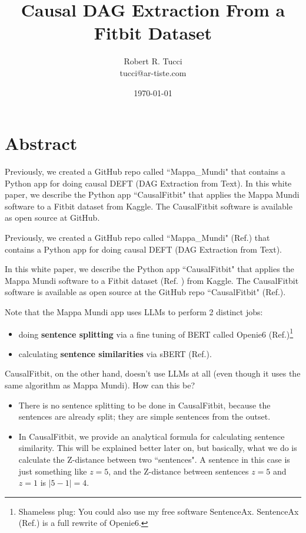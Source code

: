\documentclass[12pt]{article}
\begin{document}
\title{Causal DAG Extraction From a Fitbit Dataset}
\date{ \today}
\author{Robert R. Tucci\\
        tucci@ar-tiste.com}
\maketitle
\vskip2cm
\section*{Abstract}
Previously,
we created a GitHub repo called  ``Mappa\_Mundi"  that contains a Python app for
doing causal DEFT (DAG Extraction from Text).
In this white paper, we
describe the Python app ``CausalFitbit"
that applies the  Mappa Mundi software  to 
a Fitbit dataset from Kaggle.
The CausalFitbit software 
is available as open source at  GitHub.

\newpage

Previously,
we created a GitHub repo called  ``Mappa\_Mundi" (Ref.\cite{github-mappa-mundi}) that contains a Python app for
doing causal DEFT (DAG Extraction from Text).

In this white paper, we
describe the Python app ``CausalFitbit"
that applies the  Mappa Mundi software  to 
a Fitbit dataset (Ref. \cite{fitbit-dataset}) from Kaggle.
The CausalFitbit software 
is available as open source at the GitHub repo
``CausalFitbit" (Ref.\cite{causal-fitbit}).

Note that the Mappa Mundi app uses LLMs 
to perform 2 distinct jobs: 
\begin{itemize}
\item doing {\bf sentence splitting} via a fine tuning of BERT called Openie6 (Ref.\cite{openie6})\footnote{Shameless
plug: You could also use my free software SentenceAx. SentenceAx (Ref.\cite{sentence-ax}) is a full rewrite of Openie6.}

\item calculating {\bf sentence similarities} via sBERT (Ref.\cite{sbert}).
\end{itemize}

CausalFitbit, on the other hand,
doesn't use LLMs at all (even though it uses the same algorithm as Mappa Mundi). How can this be? 

\begin{itemize}
\item
There is no sentence splitting to be done in CausalFitbit, because the sentences are already split; they are simple sentences from the outset.  
\item In CausalFitbit, we provide an analytical
formula for calculating sentence similarity. This will be explained better later on,
but basically, what we do is 
calculate the Z-distance between two ``sentences". A sentence in this case
is just something like $z=5$,
and the Z-distance between sentences
$z=5$ and $z=1$ is $|5-1|=4$.
\end{itemize} 
\end{document}
